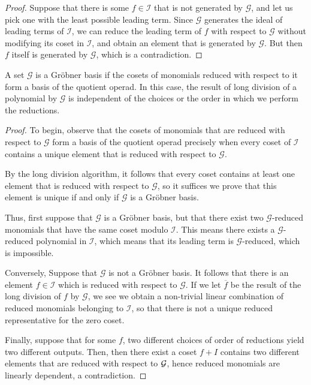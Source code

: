 \begin{proof}
Suppose that there is some $f\in \mathcal I$ that is not
generated by $\mathcal G$, and let us pick one with the least 
possible leading term. Since $\mathcal G$ generates the
ideal of leading terms of $\mathcal I$, we can reduce
the leading term of $f$ with respect to $\mathcal G$
without modifying its coset in $\mathcal I$,
and obtain an element that is generated by $\mathcal G$.
But then $f$ itself is generated by $\mathcal G$,
which is a contradiction.
\end{proof}


\begin{proposition}
A set $\mathcal G$ is a Gr\"obner basis if the cosets of monomials
reduced with respect to it form a basis of the quotient operad. 
In this case, the result of long division of a polynomial by
$\mathcal G$ is independent of the choices or the order in
 which we perform the reductions. 
\end{proposition}

\begin{proof}
To begin, observe that 
the cosets of monomials that are reduced with respect
to $\mathcal G$ form a basis of the quotient operad precisely
when every coset of $\mathcal I$ contains a unique element
that is reduced with respect to $\mathcal G$. 

By the long division algorithm, it follows that every coset
contains at least one element that is reduced with respect to $\mathcal G$,
so it suffices we prove that this element is unique if and only if
$\mathcal G$ is a Gr\"obner basis.

Thus, first suppose that $\mathcal G$ is a Gr\"obner basis, but that
there exist two $\mathcal G$-reduced monomials that have the same
coset modulo $\mathcal I$. This means there exists a $\mathcal G$-reduced 
polynomial in $\mathcal I$, which means that its leading term is
$\mathcal G$-reduced, which is impossible.

Conversely, Suppose that $\mathcal G$ is not a Gröbner basis. It follows
that there is an element $f\in\mathcal I$ which is reduced with respect to 
$\mathcal G$. If we let $\overline{f}$ be the result of the long division of
$f$ by $\mathcal G$, we see we obtain a non-trivial linear combination of reduced 
monomials belonging to $\mathcal I$, so that there is not a unique
reduced representative for the zero coset.

Finally, suppose that for some $f$, two different choices of order of reductions yield two different outputs. Then, then there exist a coset $f + I$ contains two different elements that are reduced with respect to $\mathcal G$, hence reduced monomials are linearly dependent, a contradiction.
\end{proof}

